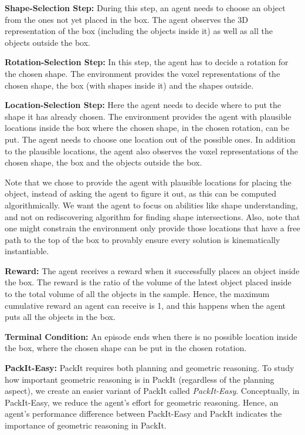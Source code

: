 \documentclass{article}
\begin{document}
\noindent \textbf{Shape-Selection Step:} During this step, an agent needs to choose an object from the ones not yet placed in the box. The agent observes the 3D representation of the box (including the objects inside it) as well as all the objects outside the box.  

\noindent \textbf{Rotation-Selection Step:} In this step, the agent has to decide a rotation for the chosen shape. The environment provides the voxel representations of the chosen shape, the box (with shapes inside it) and the shapes outside.

\noindent\textbf{Location-Selection Step:} Here the agent needs to decide where to put the shape it has already chosen. The environment provides the agent with plausible locations inside the box where the chosen shape, in the chosen rotation, can be put. The agent needs to choose one location out of the possible ones. In addition to the plausible locations, the agent also observes the voxel representations of the chosen shape, the box and the objects outside the box. 

Note that we chose to provide the agent with plausible locations for placing the object, instead of asking the agent to figure it out, as this can be computed algorithmically. We want the agent to focus on abilities like shape understanding, and not on rediscovering algorithm for finding shape intersections. Also, note that one might constrain the environment only provide those locations that have a free path to the top of the box to provably ensure every solution is kinematically instantiable.

\noindent\textbf{Reward:} The agent receives a reward when it successfully places an object inside the box. The reward is the ratio of the volume of the latest object placed inside to the total volume of all the objects in the sample. Hence, the maximum cumulative reward an agent can receive is 1, and this happens when the agent puts all the objects in the box.

\noindent\textbf{Terminal Condition:} An episode ends when there is no possible location inside the box, where the chosen shape can be put in the chosen rotation.

\noindent\textbf{PackIt-Easy:} PackIt requires both planning and geometric reasoning. To study how important geometric reasoning is in PackIt (regardless of the planning aspect), we create an easier variant of PackIt called \textit{PackIt-Easy}. Conceptually, in PackIt-Easy, we reduce the agent's effort for geometric reasoning. Hence, an agent's performance difference between PackIt-Easy and PackIt indicates the importance of geometric reasoning in PackIt.
\end{document}
